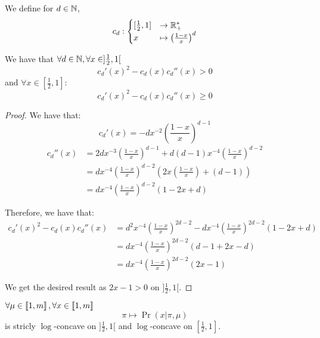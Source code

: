 \begin{lemma}
    \label{lemma:cd_log_concave_compatible}
    We define for $d \in \mathbb{N}$,
    \[ c_d: \begin{cases}
        [\frac{1}{2}, 1] &\rightarrow \mathbb{R}_+^*\\
        x &\mapsto \left(\frac{1 - x}{x}\right)^d
    \end{cases}\]

    We have that $\forall d \in \mathbb{N}, \forall x \in ]\frac{1}{2}, 1[$
    \[ c_d'(x)^2 - c_d(x) c_d''(x) > 0 \]
    and $\forall x \in [\frac{1}{2}, 1]$:
    \[ c_d'(x)^2 - c_d(x) c_d''(x) \geq 0 \]
\end{lemma} 
\begin{proof}
    We have that:
    \[ c_d'(x) = -d x^{-2} \left(\frac{1 - x}{x}\right)^{d - 1} \]
    \begin{align}
        c_d''(x) 
        &= 2d x^{-3} \left(\frac{1 - x}{x}\right)^{d - 1} +  d(d-1) x^{-4} \left(\frac{1 - x}{x}\right)^{d - 2} \\
        &= d x^{-4} \left(\frac{1 - x}{x}\right)^{d - 2} \left(2 x\left(\frac{1 - x}{x}\right) + (d - 1)\right) \\
        &= d x^{-4} \left(\frac{1 - x}{x}\right)^{d - 2} \left(1 - 2x + d\right)
    \end{align}

    Therefore, we have that:
    \begin{align}
        c_d'(x)^2 - c_d(x) c_d''(x) 
        &= d^2 x^{-4} \left(\frac{1 - x}{x}\right)^{2d - 2} - d x^{-4} \left(\frac{1 - x}{x}\right)^{2d - 2} \left(1 - 2x + d\right)\\
        &= d x^{-4} \left(\frac{1 - x}{x}\right)^{2d - 2} \left(d - 1 + 2x - d\right)\\
        &= d x^{-4} \left(\frac{1 - x}{x}\right)^{2d - 2} \left(2x - 1\right)
    \end{align}

    We get the desired result as $2x - 1 > 0$ on $]\frac{1}{2}, 1[$.
\end{proof}


\begin{thm}
    \label{thm:log_likelihood_concave_appendix}
    $\forall \mu \in \left\llbracket1, m\right\rrbracket, \forall x \in \left\llbracket1, m\right\rrbracket$
    \[ \pi \mapsto \Pr(x | \pi, \mu) \]
    is stricly $\log$-concave on $]\frac{1}{2}, 1[$ and $\log$-concave on $[\frac{1}{2}, 1]$.
\end{thm}

